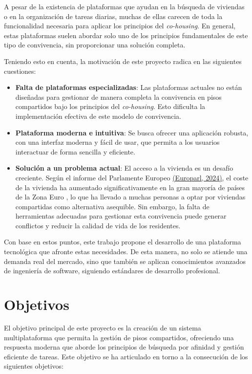 A pesar de la existencia de plataformas que ayudan en la búsqueda de viviendas o en la organización de tareas diarias, muchas de ellas carecen de toda la funcionalidad necesaria para aplicar los principios del \emph{co-housing}. En general, estas plataformas suelen abordar solo uno de los principios fundamentales de este tipo de convivencia, sin proporcionar una solución completa.

Teniendo esto en cuenta, la motivación de este proyecto radica en las siguientes cuestiones:

\begin{itemize}
    \item \textbf{Falta de plataformas especializadas}: Las plataformas actuales no están diseñadas para gestionar de manera completa la convivencia en pisos compartidos bajo los principios del \emph{co-housing}. Esto dificulta la implementación efectiva de este modelo de convivencia.
    
    \item \textbf{Plataforma moderna e intuitiva}: Se busca ofrecer una aplicación robusta, con una interfaz moderna y fácil de usar, que permita a los usuarios interactuar de forma sencilla y eficiente.
    
    \item \textbf{Solución a un problema actual}: El acceso a la vivienda es un desafío creciente. Según el informe del Parlamente Europeo \href{https://www.europarl.europa.eu/topics/es/article/20241014STO24542/el-aumento-del-coste-de-la-vivienda-en-la-union-europea?utm_source=chatgpt.com}{(Europarl, 2024)}, el coste de la vivienda ha aumentado significativamente en la gran mayoría de países de la Zona Euro \cite{DatosMacro}, lo que ha llevado a muchas personas a optar por viviendas compartidas como alternativa asequible. Sin embargo, la falta de herramientas adecuadas para gestionar esta convivencia puede generar conflictos y reducir la calidad de vida de los residentes.
\end{itemize}

Con base en estos puntos, este trabajo propone el desarrollo de una plataforma tecnológica que afronte estas necesidades. De esta manera, no solo se atiende una demanda real del mercado, sino que también se aplican conocimientos avanzados de ingeniería de software, siguiendo estándares de desarrollo profesional.

\section{Objetivos}
El objetivo principal de este proyecto es la creación de un sistema multiplataforma que permita la gestión de pisos compartidos, ofreciendo una respuesta moderna que aborde los principios de búsqueda por afinidad y gestión eficiente de tareas. Este objetivo se ha articulado en torno a la consecución de los siguientes objetivos:

